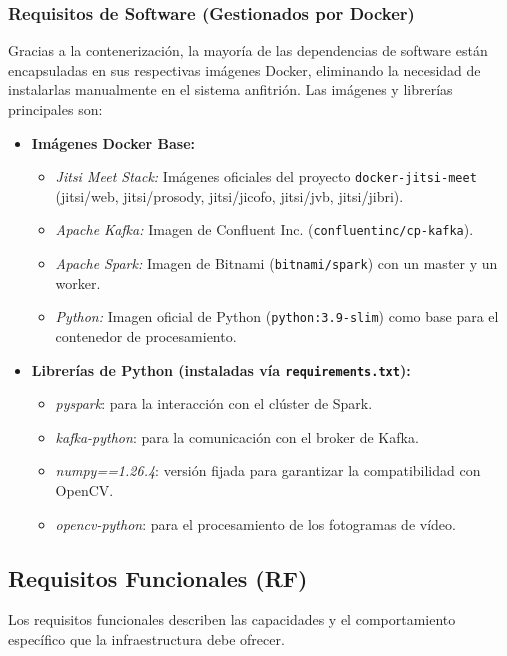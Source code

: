 \subsubsection{Requisitos de Software (Gestionados por Docker)}
Gracias a la contenerización, la mayoría de las dependencias de software están encapsuladas en sus respectivas imágenes Docker, eliminando la necesidad de instalarlas manualmente en el sistema anfitrión. Las imágenes y librerías principales son:
\begin{itemize}
    \item \textbf{Imágenes Docker Base:}
    \begin{itemize}
        \item \textit{Jitsi Meet Stack:} Imágenes oficiales del proyecto \texttt{docker-jitsi-meet} (jitsi/web, jitsi/prosody, jitsi/jicofo, jitsi/jvb, jitsi/jibri).
        \item \textit{Apache Kafka:} Imagen de Confluent Inc. (\texttt{confluentinc/cp-kafka}).
        \item \textit{Apache Spark:} Imagen de Bitnami (\texttt{bitnami/spark}) con un master y un worker.
        \item \textit{Python:} Imagen oficial de Python (\texttt{python:3.9-slim}) como base para el contenedor de procesamiento.
    \end{itemize}
    \item \textbf{Librerías de Python (instaladas vía \texttt{requirements.txt}):}
    \begin{itemize}
        \item \textit{pyspark}: para la interacción con el clúster de Spark.
        \item \textit{kafka-python}: para la comunicación con el broker de Kafka.
        \item \textit{numpy==1.26.4}: versión fijada para garantizar la compatibilidad con OpenCV.
        \item \textit{opencv-python}: para el procesamiento de los fotogramas de vídeo.
    \end{itemize}
\end{itemize}

\subsection{Requisitos Funcionales (RF)}
Los requisitos funcionales describen las capacidades y el comportamiento específico que la infraestructura debe ofrecer.


